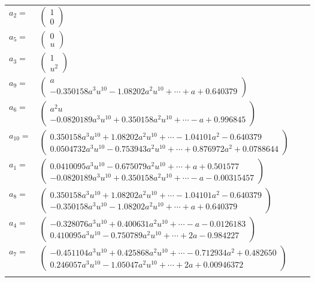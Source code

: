 \documentclass[1p]{elsarticle_modified}
\theoremstyle{definition}
\begin{document}
\begin{tabular}{m{7pt} m{180pt} m{7pt} m{180pt} }
\flushright $a_{2}=$&$\begin{pmatrix}1\\0\end{pmatrix}$ \\
\flushright $a_{5}=$&$\begin{pmatrix}0\\u\end{pmatrix}$ \\
\flushright $a_{3}=$&$\begin{pmatrix}1\\u^2\end{pmatrix}$ \\
\flushright $a_{9}=$&$\begin{pmatrix}a\\-0.350158 a^{3} u^{10}-1.08202 a^{2} u^{10}+\cdots+a+0.640379\end{pmatrix}$ \\
\flushright $a_{6}=$&$\begin{pmatrix}a^2 u\\-0.0820189 a^{3} u^{10}+0.350158 a^{2} u^{10}+\cdots-a+0.996845\end{pmatrix}$ \\
\flushright $a_{10}=$&$\begin{pmatrix}0.350158 a^{3} u^{10}+1.08202 a^{2} u^{10}+\cdots-1.04101 a^{2}-0.640379\\0.0504732 a^{3} u^{10}-0.753943 a^{2} u^{10}+\cdots+0.876972 a^{2}+0.0788644\end{pmatrix}$ \\
\flushright $a_{1}=$&$\begin{pmatrix}0.0410095 a^{3} u^{10}-0.675079 a^{2} u^{10}+\cdots+a+0.501577\\-0.0820189 a^{3} u^{10}+0.350158 a^{2} u^{10}+\cdots-a-0.00315457\end{pmatrix}$ \\
\flushright $a_{8}=$&$\begin{pmatrix}0.350158 a^{3} u^{10}+1.08202 a^{2} u^{10}+\cdots-1.04101 a^{2}-0.640379\\-0.350158 a^{3} u^{10}-1.08202 a^{2} u^{10}+\cdots+a+0.640379\end{pmatrix}$ \\
\flushright $a_{4}=$&$\begin{pmatrix}-0.328076 a^{3} u^{10}+0.400631 a^{2} u^{10}+\cdots-a-0.0126183\\0.410095 a^{3} u^{10}-0.750789 a^{2} u^{10}+\cdots+2 a-0.984227\end{pmatrix}$ \\
\flushright $a_{7}=$&$\begin{pmatrix}-0.451104 a^{3} u^{10}+0.425868 a^{2} u^{10}+\cdots-0.712934 a^{2}+0.482650\\0.246057 a^{3} u^{10}-1.05047 a^{2} u^{10}+\cdots+2 a+0.00946372\end{pmatrix}$\\&\end{tabular}
\end{document}
